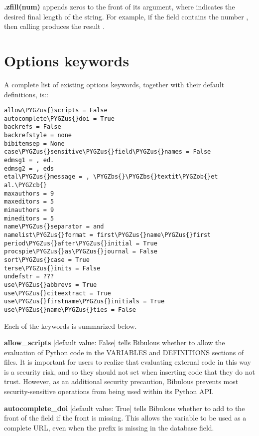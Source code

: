 \documentclass[letterpaper,10pt,english]{sphinxmanual}
\def\PYGZbs{\char`\\}
\def\PYGZus{\char`\_}
\def\PYGZob{\char`\{}
\def\PYGZcb{\char`\}}
\begin{document}
\textbf{.zfill(num)} appends zeros to the front of its argument, where  indicates the desired final length of the string. For example, if the field  contains the number , then calling  produces the result .


\section{Options keywords}
\label{guidelines_for_writing_style_templates:options-keywords}
A complete list of existing options keywords, together with their default definitions, is::

\begin{Verbatim}[commandchars=\\\{\}]
allow\PYGZus{}scripts = False
autocomplete\PYGZus{}doi = True
backrefs = False
backrefstyle = none
bibitemsep = None
case\PYGZus{}sensitive\PYGZus{}field\PYGZus{}names = False
edmsg1 = , ed.
edmsg2 = , eds
etal\PYGZus{}message = , \PYGZbs{}\PYGZbs{}textit\PYGZob{}et al.\PYGZcb{}
maxauthors = 9
maxeditors = 5
minauthors = 9
mineditors = 5
name\PYGZus{}separator = and
namelist\PYGZus{}format = first\PYGZus{}name\PYGZus{}first
period\PYGZus{}after\PYGZus{}initial = True
procspie\PYGZus{}as\PYGZus{}journal = False
sort\PYGZus{}case = True
terse\PYGZus{}inits = False
undefstr = ???
use\PYGZus{}abbrevs = True
use\PYGZus{}citeextract = True
use\PYGZus{}firstname\PYGZus{}initials = True
use\PYGZus{}name\PYGZus{}ties = False
\end{Verbatim}

Each of the keywords is summarized below.

\textbf{allow\_scripts} {[}default value: False{]} tells Bibulous whether to allow the evaluation of Python code in the VARIABLES and DEFINITIONS sections of  files. It is important for users to realize that evaluating external code in this way is a security risk, and so they should not set  when inserting code that they do not trust. However, as an additional security precaution, Bibulous prevents most security-sensitive operations from being used within its Python API.

\textbf{autocomplete\_doi} {[}default value: True{]} tells Bibulous whether to add  to the front of the  field if the front is missing. This allows the  variable to be used as a complete URL, even when the prefix is missing in the database field.
\end{document}
